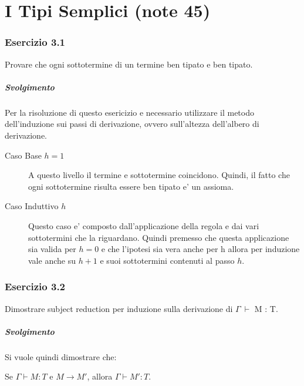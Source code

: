 \section{I Tipi Semplici (note 45)}
 
\subsubsection*{Esercizio 3.1}
Provare che ogni sottotermine di un termine ben tipato e ben tipato.
\subparagraph{Svolgimento}
Per la risoluzione di questo esericizio e necessario utilizzare il metodo dell'induzione sui passi di derivazione, ovvero sull'altezza dell'albero di derivazione.

\begin{description}

 \item[Caso Base $h=1$] A questo livello il termine e sottotermine coincidono. Quindi, il fatto che ogni sottotermine risulta essere ben tipato e' un assioma.

 \item[Caso Induttivo $h$ ] Questo caso e' composto dall'applicazione della regola e dai vari sottotermini che la riguardano. Quindi premesso che questa applicazione sia valida per $h = 0$ e che l'ipotesi sia vera anche per h allora per induzione vale anche su $h + 1$ e suoi sottotermini contenuti al passo $h$.
 
 \end{description}
 
\subsubsection*{Esercizio 3.2} 
Dimostrare subject reduction per induzione sulla derivazione di $\Gamma\:\vdash$ M : T.

\subparagraph*{Svolgimento}

Si vuole quindi dimostrare che:

\begin{center}
	Se $\Gamma \vdash{} M : T$ e $M \to{} M'$, allora $\Gamma \vdash{} M' : T$.
\end{center}



